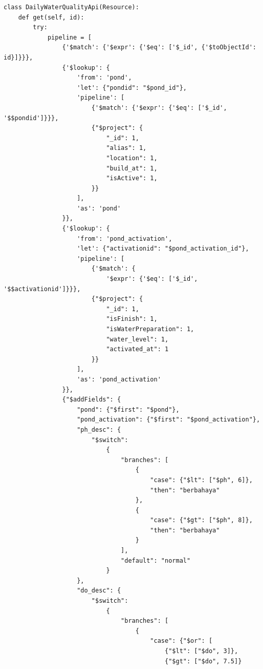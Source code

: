 \begin{enumerate}[1.]
\begin{lstlisting}
class DailyWaterQualityApi(Resource):
    def get(self, id):
        try:
            pipeline = [
                {'$match': {'$expr': {'$eq': ['$_id', {'$toObjectId': id}]}}},
                {'$lookup': {
                    'from': 'pond',
                    'let': {"pondid": "$pond_id"},
                    'pipeline': [
                        {'$match': {'$expr': {'$eq': ['$_id', '$$pondid']}}},
                        {"$project": {
                            "_id": 1,
                            "alias": 1,
                            "location": 1,
                            "build_at": 1,
                            "isActive": 1,
                        }}
                    ],
                    'as': 'pond'
                }},
                {'$lookup': {
                    'from': 'pond_activation',
                    'let': {"activationid": "$pond_activation_id"},
                    'pipeline': [
                        {'$match': {
                            '$expr': {'$eq': ['$_id', '$$activationid']}}},
                        {"$project": {
                            "_id": 1,
                            "isFinish": 1,
                            "isWaterPreparation": 1,
                            "water_level": 1,
                            "activated_at": 1
                        }}
                    ],
                    'as': 'pond_activation'
                }},
                {"$addFields": {
                    "pond": {"$first": "$pond"},
                    "pond_activation": {"$first": "$pond_activation"},
                    "ph_desc": {
                        "$switch":
                            {
                                "branches": [
                                    {
                                        "case": {"$lt": ["$ph", 6]},
                                        "then": "berbahaya"
                                    },
                                    {
                                        "case": {"$gt": ["$ph", 8]},
                                        "then": "berbahaya"
                                    }
                                ],
                                "default": "normal"
                            }
                    },
                    "do_desc": {
                        "$switch":
                            {
                                "branches": [
                                    {
                                        "case": {"$or": [
                                            {"$lt": ["$do", 3]},
                                            {"$gt": ["$do", 7.5]}

\end{lstlisting}
\end{enumerate}
